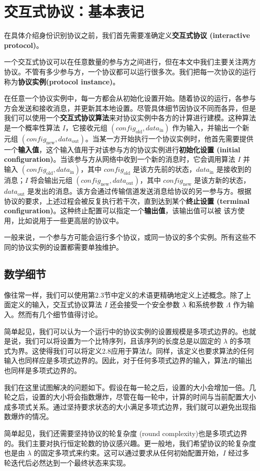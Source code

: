 \section{交互式协议：基本表记}

在具体介绍身份识别协议之前，我们首先需要准确定义\textbf{交互式协议 (interactive protocol)}。

一个交互式协议可以在任意数量的参与方之间进行，但在本文中我们主要关注两方协议。不管有多少参与方，一个协议都可以运行很多次。我们把每一次协议的运行称为\textbf{协议实例(protocol instance)}。

在任意一个协议实例中，每一方都会从初始化设置开始。随着协议的运行，各参与方会发送和接收消息，并更新其本地设置。尽管具体细节因协议不同而各异，但是我们可以使用一个\textbf{交互式协议算法}来对协议实例中各方的计算进行建模。这种算法是一个概率性算法 $I$，它接收元组 $({config}_\mathrm{old}, {data}_\mathrm{in})$ 作为输入，并输出一个新元组 $({config}_\mathrm{new}, {data}_\mathrm{out})$。当某一方开始执行一个协议实例时，他首先需要提供一个\textbf{输入值}，这个输入值用于对该参与方的协议实例进行\textbf{初始化设置 (initial configuration)}。当该参与方从网络中收到一个新的消息时，它会调用算法 $I$ 并输入 $({config}_\mathrm{old}, {data}_\mathrm{in})$，其中 ${config}_\mathrm{old}$ 是该方先前的状态，${data}_\mathrm{in}$ 是接收到的消息；$I$ 将会输出元组 $({config}_\mathrm{new}, {data}_\mathrm{out})$，其中 ${config}_\mathrm{new}$ 是该方新的状态，${data}_\mathrm{out}$ 是发出的消息。该方会通过传输信道发送消息给协议的另一参与方。根据协议的要求，上述过程会被反复执行若干次，直到达到某个\textbf{终止设置 (terminal configuration)}。这种终止配置可以指定一个\textbf{输出值}，该输出值可以被
该方使用，比如说用于一些更高层的协议中。

一般来说，一个参与方可能会运行多个协议，或同一协议的多个实例。所有这些不同的协议实例的设置都需要单独维护。

\subsection{数学细节}

像往常一样，我们可以使用第2.3节中定义的术语更精确地定义上述概念。除了上面定义的输入，交互式协议算法 $I$ 还会接受一个安全参数 $\lambda$ 和系统参数 $\Lambda$ 作为输入。然而有几个细节值得讨论。

简单起见，我们可以认为一个运行中的协议实例的设置规模是多项式边界的。也就是说，我们可以将设置为一个比特序列，且该序列的长度总是以固定的 $\lambda$ 的多项式为界。这使得我们可以将定义2.8应用于算法$I$。同样，该定义也要求算法的任何输入也同样应是多项式边界的。因此，对于任何多项式边界的输入，算法$I$的输出也同样是多项式边界的。

我们在这里试图解决的问题如下。假设在每一轮之后，设置的大小会增加一倍。几轮之后，设置的大小将会指数爆炸，尽管在每一轮中，计算的时间与当前配置大小成多项式关系。通过坚持要求状态的大小满足多项式边界，我们就可以避免出现指数爆炸的情况。

简单起见，我们还需要坚持协议的轮复杂度 (round complexity)也是多项式边界的。我们主要对执行恒定轮数的协议感兴趣。更一般地，我们希望协议的轮复杂度也是由 $\lambda$ 的固定多项式来约束。这可以通过要求从任何初始配置开始，$I$ 经过多轮迭代后必然达到一个最终状态来实现。
